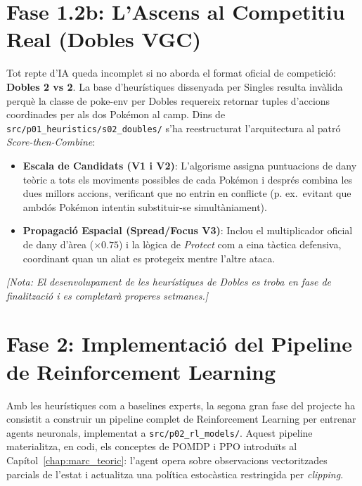 \section{Fase 1.2b: L'Ascens al Competitiu Real (Dobles VGC)}

Tot repte d'IA queda incomplet si no aborda el format oficial de competició: \textbf{Dobles 2 vs 2}. La base d'heurístiques dissenyada per Singles resulta invàlida perquè la classe de poke-env per Dobles requereix retornar tuples d'accions coordinades per als dos Pokémon al camp. Dins de \texttt{src/p01\_heuristics/s02\_doubles/} s'ha reestructurat l'arquitectura al patró \textit{Score-then-Combine}:

\begin{itemize}
    \item \textbf{Escala de Candidats (V1 i V2)}: L'algorisme assigna puntuacions de dany teòric a tots els moviments possibles de cada Pokémon i després combina les dues millors accions, verificant que no entrin en conflicte (p. ex.\ evitant que ambdós Pokémon intentin substituir-se simultàniament).
    \item \textbf{Propagació Espacial (Spread/Focus V3)}: Inclou el multiplicador oficial de dany d'àrea ($\times 0.75$) i la lògica de \textit{Protect} com a eina tàctica defensiva, coordinant quan un aliat es protegeix mentre l'altre ataca.
\end{itemize}

\textit{[Nota: El desenvolupament de les heurístiques de Dobles es troba en fase de finalització i es completarà properes setmanes.]}


\section{Fase 2: Implementació del Pipeline de Reinforcement Learning}
\label{sec:rl_impl}

Amb les heurístiques com a baselines experts, la segona gran fase del projecte ha consistit a construir un pipeline complet de Reinforcement Learning per entrenar agents neuronals, implementat a \texttt{src/p02\_rl\_models/}. Aquest pipeline materialitza, en codi, els conceptes de POMDP i PPO introduïts al Capítol~\ref{chap:marc_teoric}: l'agent opera sobre observacions vectoritzades parcials de l'estat i actualitza una política estocàstica restringida per \textit{clipping}.

